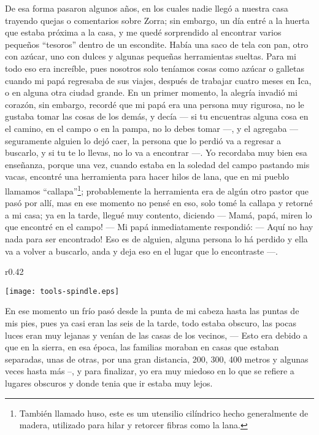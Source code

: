 De esa forma pasaron algunos años, en los cuales nadie llegó a nuestra casa trayendo quejas o comentarios sobre Zorra; sin embargo, un día entré a la huerta que estaba próxima a la casa, y me quedé sorprendido al encontrar varios pequeños ``tesoros'' dentro de un escondite. Había una saco de tela con pan, otro con azúcar, uno con dulces y algunas pequeñas herramientas sueltas.
Para mi todo eso era increíble, pues nosotros solo teníamos cosas como azúcar o galletas cuando mi papá regresaba de sus viajes, después de trabajar cuatro meses en Ica, o en alguna otra ciudad grande. 
En un primer momento, la alegría invadió mi corazón, sin embargo, recordé que mi papá era una persona muy rigurosa, no le gustaba tomar las cosas de los demás, y decía --- si tu encuentras alguna cosa en el camino, en el campo o en la pampa, no lo debes tomar ---, y el agregaba --- seguramente alguien lo dejó caer, la persona que lo perdió va a regresar a buscarlo, y si tu te lo llevas, no lo va a encontrar ---.
Yo recordaba muy bien esa enseñanza, porque una vez, cuando estaba en la soledad del campo pastando mis vacas, encontré una herramienta para hacer hilos de lana, que en mi pueblo llamamos ``callapa''\footnote{También llamado huso, este es um utensilio cilíndrico hecho generalmente de madera, utilizado para hilar y retorcer fibras como la lana.}; probablemente la herramienta era de algún otro pastor que pasó por allí, mas en ese momento no pensé en eso, solo tomé la callapa y retorné a mi casa; ya en la tarde, llegué muy contento, diciendo --- Mamá, papá, miren lo que encontré en el campo! ---
Mi papá inmediatamente respondió:  --- Aquí no hay nada para ser encontrado! Eso es de alguien, alguna persona lo há perdido y ella va a volver a buscarlo, anda y deja eso en el lugar que lo encontraste ---.


\begin{wrapfigure}{r}{0.42\textwidth}
  \begin{center}
  \vspace{-10pt}
    \texttt{[image: tools-spindle.eps]}
  \end{center}
  \vspace{-20pt}
\end{wrapfigure}
En ese momento un frío pasó desde la punta de mi cabeza hasta las puntas de mis pies, pues ya casi eran las seis de la tarde, todo estaba obscuro, las pocas luces eran muy lejanas y venían de las casas de los vecinos, --- Esto era debido a que en la sierra, en esa época, las familias moraban en casas que estaban separadas, unas de otras, por una gran distancia, 200, 300, 400 metros y algunas veces hasta más --, y para finalizar, yo era muy miedoso en lo que se refiere a lugares obscuros y donde tenia que ir estaba muy lejos.

